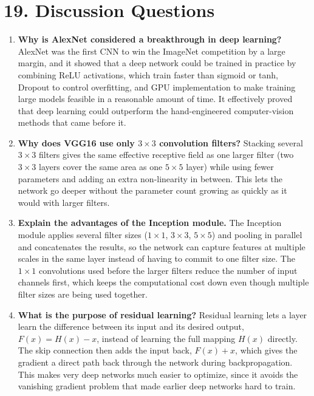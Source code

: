 \documentclass[11pt]{article}
\begin{document}

\section*{19. Discussion Questions}

\begin{enumerate}

\item \textbf{Why is AlexNet considered a breakthrough in deep learning?}
AlexNet was the first CNN to win the ImageNet competition by a large
margin, and it showed that a deep network could be trained in practice by
combining ReLU activations, which train faster than sigmoid or tanh,
Dropout to control overfitting, and GPU implementation to make training
large models feasible in a reasonable amount of time. It effectively
proved that deep learning could outperform the hand-engineered
computer-vision methods that came before it.

\item \textbf{Why does VGG16 use only $3\times3$ convolution filters?}
Stacking several $3\times3$ filters gives the same effective receptive
field as one larger filter (two $3\times3$ layers cover the same area as
one $5\times5$ layer) while using fewer parameters and adding an extra
non-linearity in between. This lets the network go deeper without the
parameter count growing as quickly as it would with larger filters.

\item \textbf{Explain the advantages of the Inception module.}
The Inception module applies several filter sizes ($1\times1$,
$3\times3$, $5\times5$) and pooling in parallel and concatenates the
results, so the network can capture features at multiple scales in the
same layer instead of having to commit to one filter size. The
$1\times1$ convolutions used before the larger filters reduce the number
of input channels first, which keeps the computational cost down even
though multiple filter sizes are being used together.

\item \textbf{What is the purpose of residual learning?}
Residual learning lets a layer learn the difference between its input and
its desired output, $F(x) = H(x) - x$, instead of learning the full
mapping $H(x)$ directly. The skip connection then adds the input back,
$F(x) + x$, which gives the gradient a direct path back through the
network during backpropagation. This makes very deep networks much
easier to optimize, since it avoids the vanishing gradient problem that
made earlier deep networks hard to train.


\end{enumerate}
\end{document}
